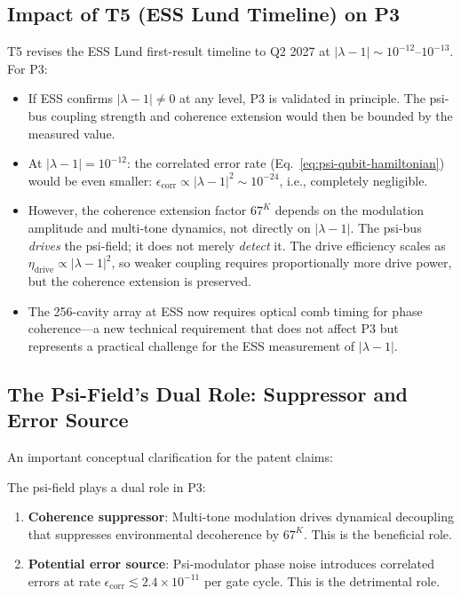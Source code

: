 \documentclass[11pt]{article}
\theoremstyle{definition}
\theoremstyle{remark}
\begin{document}
\subsection{Impact of T5 (ESS Lund Timeline) on P3}
\label{sec:t5-impact}

T5 revises the ESS Lund first-result timeline to Q2 2027 at
$|\lambda-1| \sim 10^{-12}\text{--}10^{-13}$.  For P3:

\begin{itemize}
  \item If ESS confirms $|\lambda-1| \neq 0$ at any level, P3 is validated
    in principle.  The psi-bus coupling strength and coherence extension
    would then be bounded by the measured value.

  \item At $|\lambda-1| = 10^{-12}$: the correlated error rate
    (Eq.~\ref{eq:psi-qubit-hamiltonian}) would be even smaller:
    $\epsilon_{\mathrm{corr}} \propto |\lambda-1|^2 \sim 10^{-24}$,
    i.e., completely negligible.

  \item However, the coherence extension factor $67^K$ depends on the
    modulation amplitude and multi-tone dynamics, not directly on
    $|\lambda-1|$.  The psi-bus \emph{drives} the psi-field; it does
    not merely \emph{detect} it.  The drive efficiency scales as
    $\eta_{\mathrm{drive}} \propto |\lambda-1|^2$, so weaker coupling
    requires proportionally more drive power, but the coherence extension
    is preserved.

  \item The 256-cavity array at ESS now requires optical comb timing for
    phase coherence---a new technical requirement that does not affect P3
    but represents a practical challenge for the ESS measurement of
    $|\lambda-1|$.
\end{itemize}

\subsection{The Psi-Field's Dual Role: Suppressor and Error Source}
\label{sec:dual-role}

An important conceptual clarification for the patent claims:

The psi-field plays a dual role in P3:
\begin{enumerate}
  \item \textbf{Coherence suppressor}: Multi-tone modulation drives
    dynamical decoupling that suppresses environmental decoherence by
    $67^K$.  This is the beneficial role.

  \item \textbf{Potential error source}: Psi-modulator phase noise introduces
    correlated errors at rate $\epsilon_{\mathrm{corr}} \lesssim
    2.4\times10^{-11}$ per gate cycle.  This is the detrimental role.
\end{enumerate}
\end{document}
